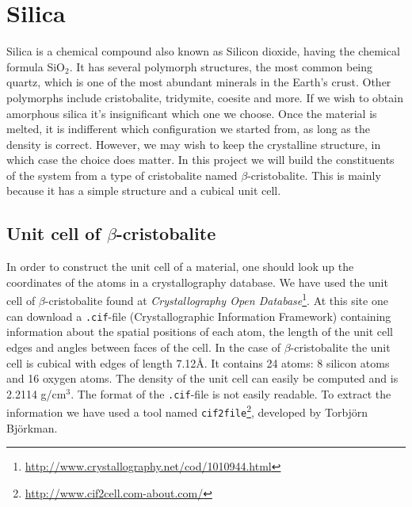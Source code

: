 \documentclass[twoside,english]{uiofysmaster}
\begin{document}
\section{Silica}
Silica is a chemical compound also known as Silicon dioxide, having the chemical formula SiO$_2$. It has several polymorph structures, the most common being quartz, which is one of the most abundant minerals in the Earth's crust. Other polymorphs include cristobalite, tridymite, coesite and more.    
If we wish to obtain amorphous silica it's insignificant which one we choose. 
Once the material is melted, it is indifferent which configuration we started from, as long as the density is correct.
However, we may wish to keep the crystalline structure, in which case the choice does matter.
In this project we will build the constituents of the system from a type of cristobalite named $\beta$-cristobalite. 
This is mainly because it has a simple structure and a cubical unit cell.


\subsection{Unit cell of $\beta$-cristobalite}
In order to construct the unit cell of a material, one should look up the coordinates of the atoms in a crystallography database. We have used the unit cell of $\beta$-cristobalite found at \textit{Crystallography Open Database}\footnote{\href{http://www.crystallography.net/cod/1010944.html}{http://www.crystallography.net/cod/1010944.html}}. 
At this site one can download a \texttt{.cif}-file (Crystallographic Information Framework) containing information about the spatial positions of each atom, the length of the unit cell edges and angles between faces of the cell. 
In the case of $\beta$-cristobalite the unit cell is cubical with edges of length 7.12Å. 
It contains 24 atoms: 8 silicon atoms and 16 oxygen atoms. 
The density of the unit cell can easily be computed and is 2.2114 g/cm$^3$.
The format of the \texttt{.cif}-file is not easily readable. To extract the information we have used a tool named \texttt{cif2file}\footnote{\href{http://www.cif2cell.com-about.com/}{http://www.cif2cell.com-about.com/}}, developed by Torbjörn Björkman. 
\end{document}
